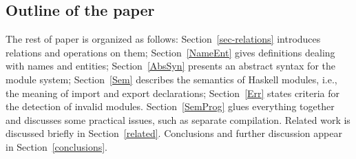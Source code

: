 \subsection{Outline of the paper}
The rest of paper is organized as follows:
Section~\ref{sec-relations} introduces relations and operations on them; 
Section~\ref{NameEnt} gives definitions dealing with names and entities; 
Section~\ref{AbsSyn} presents an abstract syntax for the module system; 
Section~\ref{Sem} describes the semantics of Haskell modules, i.e., the
meaning of import and export declarations; 
Section~\ref{Err} states criteria for the detection of invalid modules.
Section~\ref{SemProg} glues everything together and discusses some practical
issues, such as separate compilation.
Related work is discussed briefly in Section~\ref{related}.
Conclusions and further discussion appear in Section~\ref{conclusions}.
